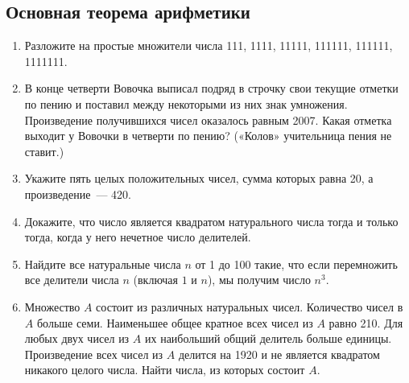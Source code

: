 \documentclass[11pt]{article}
\begin{document}
    \subsection{Основная теорема арифметики}
    \begin{enumerate}[start=34,label={\bfseries \arabic*.}]
        \item Разложите на простые множители числа 111, 1111, 11111, 111111, 111111, 1111111.

        \item  В конце четверти Вовочка выписал подряд в строчку свои текущие отметки по пению и поставил между некоторыми из них знак умножения. Произведение получившихся чисел оказалось равным 2007. Какая отметка выходит у Вовочки в четверти по пению? («Колов» учительница пения не ставит.)

        \item Укажите пять целых положительных чисел, сумма которых равна 20, а произведение~--- 420.

        \item Докажите, что число является квадратом натурального числа тогда и только тогда, когда у него нечетное число делителей.

        \item Найдите все натуральные числа $n$ от 1 до 100 такие, что если перемножить все делители
              числа $n$ (включая $1$ и $n$), мы получим число $n^3$.

        \item Множество $A$ состоит из различных натуральных чисел. Количество чисел в $A$ больше семи. Наименьшее общее кратное всех чисел из  $A$ равно 210. Для любых двух чисел из $A$ их наибольший общий делитель больше единицы. Произведение всех чисел из $A$ делится на 1920 и не является квадратом никакого целого числа.
              Найти числа, из которых состоит $A$.
    \end{enumerate}
\end{document}
